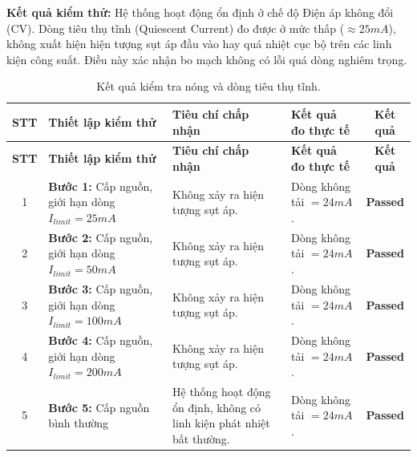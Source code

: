         \textbf{Kết quả kiểm thử:}
        Hệ thống hoạt động ổn định ở chế độ Điện áp không đổi (CV). Dòng tiêu thụ tĩnh (Quiescent Current) đo được ở mức thấp ($\approx 25mA$), không xuất hiện hiện tượng sụt áp đầu vào hay quá nhiệt cục bộ trên các linh kiện công suất. Điều này xác nhận bo mạch không có lỗi quá dòng nghiêm trọng.
        \begin{longtable}{|c|p{4cm}|p{4.5cm}|p{3.5cm}|c|}
            \caption{Kết quả kiểm tra nóng và dòng tiêu thụ tĩnh.}
            \label{tab:smoke_test_results_final} \\
            \hline
            \textbf{STT} & \textbf{Thiết lập kiểm thử} & \textbf{Tiêu chí chấp nhận} & \textbf{Kết quả đo thực tế} & \textbf{Kết quả} \\ \hline
            \endfirsthead
            \hline
            \textbf{STT} & \textbf{Thiết lập kiểm thử} & \textbf{Tiêu chí chấp nhận} & \textbf{Kết quả đo thực tế} & \textbf{Kết quả} \\ \hline
            \endhead
            \hline
            \endfoot
            \endlastfoot

            1 & \textbf{Bước 1:} Cấp nguồn, giới hạn dòng $I_{limit} = 25mA$ & Không xảy ra hiện tượng sụt áp. & Dòng không tải $= 24mA$. & \textcolor{modern_blue}{\textbf{Passed}} \\ \hline

            2 & \textbf{Bước 2:} Cấp nguồn, giới hạn dòng $I_{limit} = 50mA$ & Không xảy ra hiện tượng sụt áp. & Dòng không tải $= 24mA$. & \textcolor{modern_blue}{\textbf{Passed}} \\ \hline
            
            3 & \textbf{Bước 3:} Cấp nguồn, giới hạn dòng $I_{limit} = 100mA$ & Không xảy ra hiện tượng sụt áp. & Dòng không tải $= 24mA$. & \textcolor{modern_blue}{\textbf{Passed}} \\ \hline
            
            4 & \textbf{Bước 4:} Cấp nguồn, giới hạn dòng $I_{limit} = 200mA$ & Không xảy ra hiện tượng sụt áp. & Dòng không tải $= 24mA$. & \textcolor{modern_blue}{\textbf{Passed}} \\ \hline
            
            5 & \textbf{Bước 5:} Cấp nguồn bình thường & Hệ thống hoạt động ổn định, không có linh kiện phát nhiệt bất thường. & Dòng không tải $= 24mA$. & \textcolor{modern_blue}{\textbf{Passed}} \\ \hline
        \end{longtable}


